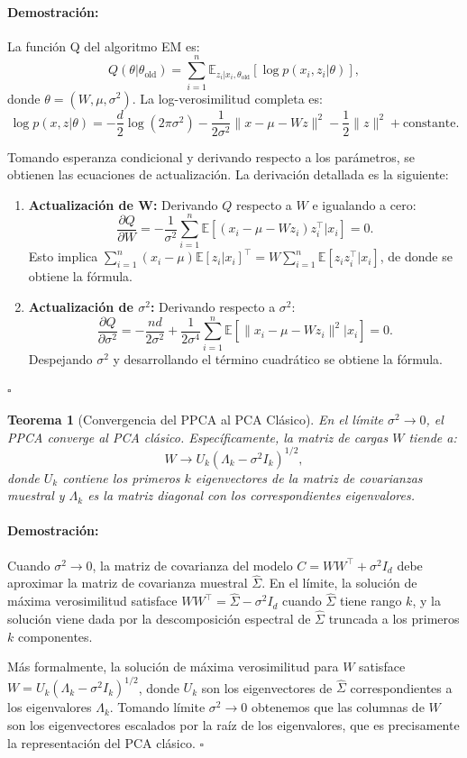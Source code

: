 \documentclass[11pt]{article}
\theoremstyle{plain}
\newtheorem{theorem}{Teorema}[section]
\newenvironment{proof}{\paragraph{Demostración:}}{\hfill$\square$}
\begin{document}
\begin{proof}
La función Q del algoritmo EM es:
\[
Q(\theta|\theta_{\text{old}}) = \sum_{i=1}^n \mathbb{E}_{z_i|x_i,\theta_{\text{old}}} [\log p(x_i, z_i | \theta)],
\]
donde $\theta = (W, \mu, \sigma^2)$. La log-verosimilitud completa es:
\[
\log p(x, z | \theta) = -\frac{d}{2}\log(2\pi\sigma^2) - \frac{1}{2\sigma^2}\|x - \mu - Wz\|^2 - \frac{1}{2}\|z\|^2 + \text{constante}.
\]

Tomando esperanza condicional y derivando respecto a los parámetros, se obtienen las ecuaciones de actualización. La derivación detallada es la siguiente:

\begin{enumerate}
    \item \textbf{Actualización de W:} Derivando $Q$ respecto a $W$ e igualando a cero:
    \[
    \frac{\partial Q}{\partial W} = -\frac{1}{\sigma^2} \sum_{i=1}^n \mathbb{E}[(x_i - \mu - W z_i) z_i^\top | x_i] = 0.
    \]
    Esto implica $\sum_{i=1}^n (x_i - \mu) \mathbb{E}[z_i|x_i]^\top = W \sum_{i=1}^n \mathbb{E}[z_i z_i^\top|x_i]$, de donde se obtiene la fórmula.
    
    \item \textbf{Actualización de $\sigma^2$:} Derivando respecto a $\sigma^2$:
    \[
    \frac{\partial Q}{\partial \sigma^2} = -\frac{nd}{2\sigma^2} + \frac{1}{2\sigma^4} \sum_{i=1}^n \mathbb{E}[\|x_i - \mu - W z_i\|^2 | x_i] = 0.
    \]
    Despejando $\sigma^2$ y desarrollando el término cuadrático se obtiene la fórmula.
\end{enumerate}
\end{proof}

\begin{theorem}[Convergencia del PPCA al PCA Clásico]
\label{thm:ppca_limit}
En el límite $\sigma^2 \to 0$, el PPCA converge al PCA clásico. Específicamente, la matriz de cargas $W$ tiende a:
\[
W \to U_k (\Lambda_k - \sigma^2 I_k)^{1/2},
\]
donde $U_k$ contiene los primeros $k$ eigenvectores de la matriz de covarianzas muestral y $\Lambda_k$ es la matriz diagonal con los correspondientes eigenvalores.
\end{theorem}

\begin{proof}
Cuando $\sigma^2 \to 0$, la matriz de covarianza del modelo $C = WW^\top + \sigma^2 I_d$ debe aproximar la matriz de covarianza muestral $\hat{\Sigma}$. En el límite, la solución de máxima verosimilitud satisface $WW^\top = \hat{\Sigma} - \sigma^2 I_d$ cuando $\hat{\Sigma}$ tiene rango $k$, y la solución viene dada por la descomposición espectral de $\hat{\Sigma}$ truncada a los primeros $k$ componentes.

Más formalmente, la solución de máxima verosimilitud para $W$ satisface $W = U_k (\Lambda_k - \sigma^2 I_k)^{1/2}$, donde $U_k$ son los eigenvectores de $\hat{\Sigma}$ correspondientes a los eigenvalores $\Lambda_k$. Tomando límite $\sigma^2 \to 0$ obtenemos que las columnas de $W$ son los eigenvectores escalados por la raíz de los eigenvalores, que es precisamente la representación del PCA clásico.
\end{proof}
\end{document}
